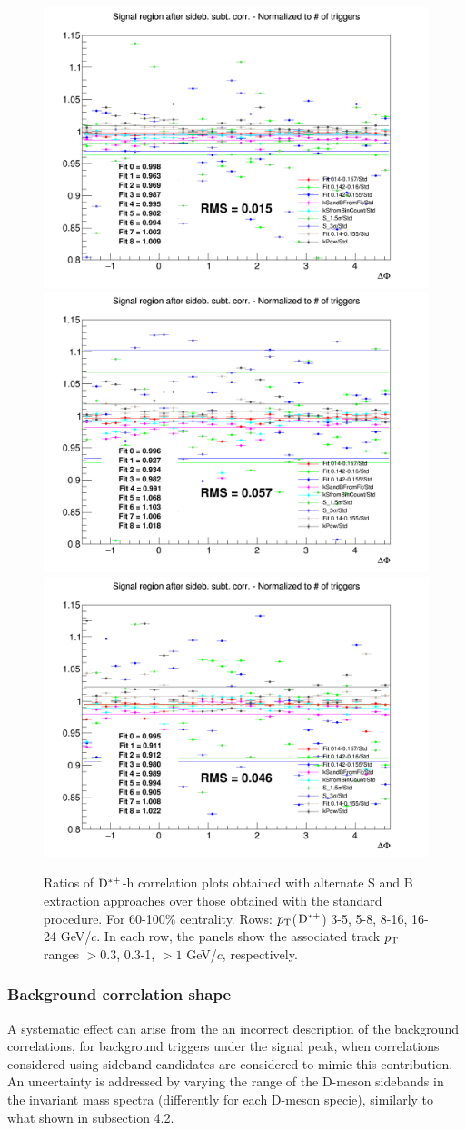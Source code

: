 \begin{figure}
{\includegraphics[width=0.31\linewidth]{figuresVsCent/Dstar/SystSandB/60100_SandB_Syst/Ratio_AzimCorrDistr_Dstar_Canvas_PtIntBins10to10_PoolInt_thr03to99_YIELD_60100.png}}
{\includegraphics[width=0.31\linewidth]{figuresVsCent/Dstar/SystSandB/60100_SandB_Syst/Ratio_AzimCorrDistr_Dstar_Canvas_PtIntBins10to10_PoolInt_thr03to1_YIELD_60100.png}}
{\includegraphics[width=0.31\linewidth]{figuresVsCent/Dstar/SystSandB/60100_SandB_Syst/Ratio_AzimCorrDistr_Dstar_Canvas_PtIntBins10to10_PoolInt_thr1to99_YIELD_60100.png}} \\
 \caption{Ratios of ${\rm D^{*+}}$-h correlation plots obtained with alternate S and B extraction approaches over those obtained with the standard procedure. For 60-100\% centrality. Rows: $p_{\rm T}$(${\rm D^{*+}}$) 3-5, 5-8, 8-16, 16-24 GeV/$c$. In each row, the panels show the associated track
$p_{\rm T}$ ranges $> 0.3$, 0.3-1, $> 1$ GeV/$c$, respectively.}
\label{fig:SysSandB60100Dstar}
\end{figure}


\subsubsection{Background correlation shape}
A systematic effect can arise from the an incorrect description of the background correlations, for background triggers under the signal peak, when correlations considered using sideband candidates are considered to mimic this contribution. An uncertainty is addressed by varying the range of the D-meson sidebands in the invariant mass spectra (differently for each D-meson specie), similarly to what shown in subsection 4.2.

